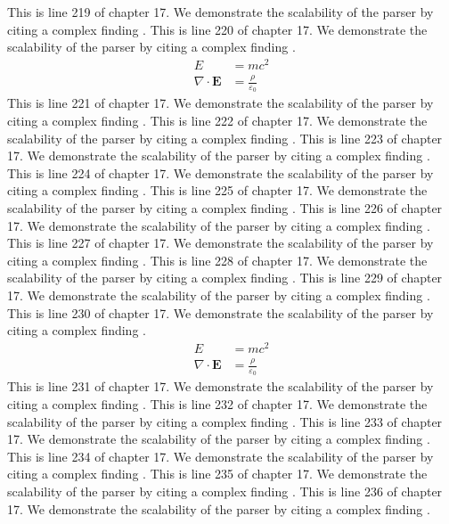 This is line 219 of chapter 17. We demonstrate the scalability of the parser by citing a complex finding \cite{ref17_219}.
This is line 220 of chapter 17. We demonstrate the scalability of the parser by citing a complex finding \cite{ref17_220}.
\begin{align*}
  E &= mc^2 \\
  \nabla \cdot \mathbf{E} &= \frac{\rho}{\varepsilon_0}
\end{align*}
This is line 221 of chapter 17. We demonstrate the scalability of the parser by citing a complex finding \cite{ref17_221}.
This is line 222 of chapter 17. We demonstrate the scalability of the parser by citing a complex finding \cite{ref17_222}.
This is line 223 of chapter 17. We demonstrate the scalability of the parser by citing a complex finding \cite{ref17_223}.
This is line 224 of chapter 17. We demonstrate the scalability of the parser by citing a complex finding \cite{ref17_224}.
This is line 225 of chapter 17. We demonstrate the scalability of the parser by citing a complex finding \cite{ref17_225}.
This is line 226 of chapter 17. We demonstrate the scalability of the parser by citing a complex finding \cite{ref17_226}.
This is line 227 of chapter 17. We demonstrate the scalability of the parser by citing a complex finding \cite{ref17_227}.
This is line 228 of chapter 17. We demonstrate the scalability of the parser by citing a complex finding \cite{ref17_228}.
This is line 229 of chapter 17. We demonstrate the scalability of the parser by citing a complex finding \cite{ref17_229}.
This is line 230 of chapter 17. We demonstrate the scalability of the parser by citing a complex finding \cite{ref17_230}.
\begin{align*}
  E &= mc^2 \\
  \nabla \cdot \mathbf{E} &= \frac{\rho}{\varepsilon_0}
\end{align*}
This is line 231 of chapter 17. We demonstrate the scalability of the parser by citing a complex finding \cite{ref17_231}.
This is line 232 of chapter 17. We demonstrate the scalability of the parser by citing a complex finding \cite{ref17_232}.
This is line 233 of chapter 17. We demonstrate the scalability of the parser by citing a complex finding \cite{ref17_233}.
This is line 234 of chapter 17. We demonstrate the scalability of the parser by citing a complex finding \cite{ref17_234}.
This is line 235 of chapter 17. We demonstrate the scalability of the parser by citing a complex finding \cite{ref17_235}.
This is line 236 of chapter 17. We demonstrate the scalability of the parser by citing a complex finding \cite{ref17_236}.
